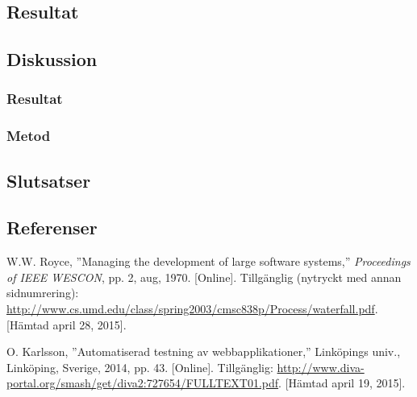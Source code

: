 \subsection{Resultat}
\subsection{Diskussion}
\subsubsection{Resultat}
\subsubsection{Metod}
\subsection{Slutsatser}
\subsection{Referenser}
\vspace{-9mm}
\renewcommand{\refname}{}
\begin{thebibliography}{9}

W.W. Royce, ''Managing the development of large software systems,''
\textit{Proceedings of IEEE WESCON}, pp. 2, aug, 1970.
[Online].
Tillgänglig (nytryckt med annan sidnumrering):
\url{http://www.cs.umd.edu/class/spring2003/cmsc838p/Process/waterfall.pdf}.
[Hämtad april 28, 2015].

O. Karlsson, ''Automatiserad testning av webbapplikationer,''
Linköpings univ., Linköping, Sverige, 2014, pp. 43.
[Online]. 
Tillgänglig: 
\url{http://www.diva-portal.org/smash/get/diva2:727654/FULLTEXT01.pdf}.
[Hämtad april 19, 2015].

\end{thebibliography}
